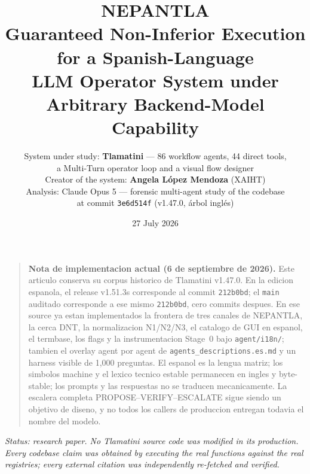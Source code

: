 \documentclass[11pt,a4paper]{article}
\theoremstyle{plain}
\theoremstyle{definition}
\theoremstyle{remark}
\newcommand{\code}[1]{\texttt{\small #1}}
\begin{document}
\title{\textbf{NEPANTLA}\\[0.35em]
  \large Guaranteed Non-Inferior Execution for a Spanish-Language\\
  LLM Operator System under Arbitrary Backend-Model Capability}

\author{%
  System under study: \textbf{Tlamatini} --- 86 workflow agents, 44 direct tools,\\
  a Multi-Turn operator loop and a visual flow designer\\[0.4em]
  Creator of the system: \textbf{Angela L\'opez Mendoza} \; (XAIHT)\\[0.2em]
  Analysis: Claude Opus 5 --- forensic multi-agent study of the codebase\\
  at commit \code{3e6d514f} (v1.47.0, árbol inglés)%
}

\date{27 July 2026}

\maketitle

\begin{quote}\small
\textbf{Nota de implementacion actual (6 de septiembre de 2026).}
Este articulo conserva su corpus historico de Tlamatini v1.47.0. En la edicion
espanola, el release v1.51.3s corresponde al commit \texttt{212b0bd}; el
\texttt{main} auditado corresponde a ese mismo \texttt{212b0bd}, cero commits despues.
En ese source ya estan implementados la frontera
de tres canales de NEPANTLA, la cerca DNT, la normalizacion N1/N2/N3, el catalogo
de GUI en espanol, el termbase, los flags y la instrumentacion Stage~0 bajo
\texttt{agent/i18n/}; tambien el overlay agent por agent de
\texttt{agents\_descriptions.es.md} y un harness visible de 1,000 preguntas.
El espanol es la lengua matriz; los simbolos machine y el
lexico tecnico estable permanecen en ingles y byte-stable; los prompts y las
respuestas no se traducen mecanicamente. La escalera completa
PROPOSE--VERIFY--ESCALATE sigue siendo un objetivo de diseno, y no todos los
callers de produccion entregan todavia el nombre del modelo.
\end{quote}

\begin{abstract}

\end{abstract}

\vspace{1em}
\begin{center}
\begin{minipage}{0.86\textwidth}
\footnotesize\itshape
Status: research paper. No Tlamatini source code was modified in its
production. Every codebase claim was obtained by executing the real functions
against the real registries; every external citation was independently
re-fetched and verified.
\end{minipage}
\end{center}
\end{document}
